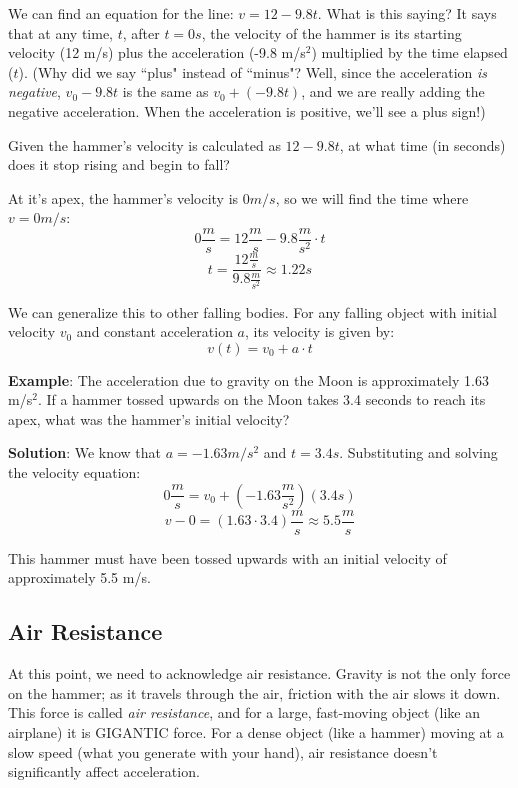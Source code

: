We can find an equation for the line: $v = 12 - 9.8t$. What is this saying? It 
says that at any time, $t$, after $t=0s$, the velocity of the hammer is its 
starting velocity (12 m/s) plus the acceleration (-9.8 m/s$^2$) multiplied by 
the time elapsed ($t$). (Why did we say ``plus" instead of ``minus"? Well, 
since the acceleration \textit{is negative}, $v_0-9.8t$ is the same as $v_0 + 
\left( -9.8t \right)$, and we are really adding the negative acceleration. When 
the acceleration is positive, we'll see a plus sign!)

\begin{Exercise}[title={When is the apex of flight?}, label=vapex]
  Given the hammer's velocity is calculated as $12 - 9.8t$, at what time (in 
  seconds) does it stop rising and begin to fall?
\end{Exercise}
\begin{Answer}[ref=vapex]
  At it's apex, the hammer's velocity is $0 m/s$, so we will find the time 
  where $v=0m/s$:
  $$0 \frac{m}{s} = 12 \frac{m}{s} - 9.8 \frac{m}{s^2} \cdot t$$
  $$t = \frac{12 \frac{m}{s}}{9.8 \frac{m}{s^2}} \approx 1.22s$$
\end{Answer}

We can generalize this to other falling bodies. For any falling object with 
initial velocity  $v_0$ and constant acceleration $a$, its velocity is given 
by:
$$v(t) = v_0 + a \cdot t$$

\textbf{Example}: The acceleration due to gravity on the Moon is approximately 
1.63 m/s$^2$. If a hammer tossed upwards on the Moon takes 3.4 seconds to reach 
its apex, what was the hammer's initial velocity?

\textbf{Solution}: We know that $a = -1.63 m/s^2$ and $t = 3.4s$. Substituting 
and solving the velocity equation:
$$0 \frac{m}{s} = v_0 + \left( -1.63 \frac{m}{s^2} \right) \left( 3.4 s \right)$$
$$v-0 = \left( 1.63 \cdot 3.4 \right) \frac{m}{s} \approx 5.5 \frac{m}{s}$$

This hammer must have been tossed upwards with an initial velocity of 
approximately 5.5 m/s.

\subsection{Air Resistance}

At this point, we need to acknowledge air resistance. Gravity
is not the only force on the hammer; as it travels through the air,
friction with the air slows it down. This force is called \emph{air resistance},
and for a large, fast-moving object (like an airplane) it is GIGANTIC force. 
For a dense object (like a hammer) moving at a slow speed (what you generate
with your hand), air resistance doesn't significantly affect acceleration.

